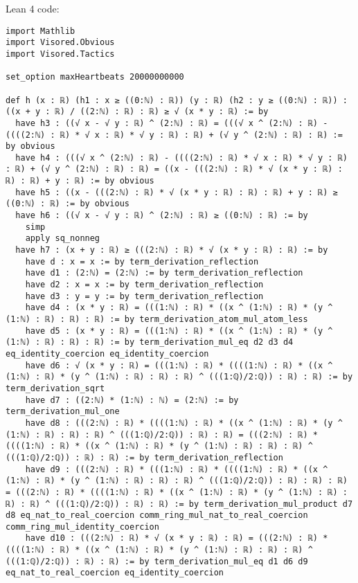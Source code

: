 \documentclass{article}
\begin{document}
Lean 4 code:
\begin{tcolorbox}[colback=white!10, width=\linewidth]
\begin{lstlisting}[language=Lean4]
import Mathlib
import Visored.Obvious
import Visored.Tactics

set_option maxHeartbeats 20000000000

def h (x : ℝ) (h1 : x ≥ ((0:ℕ) : ℝ)) (y : ℝ) (h2 : y ≥ ((0:ℕ) : ℝ)) : ((x + y : ℝ) / ((2:ℕ) : ℝ) : ℝ) ≥ √ (x * y : ℝ) := by
  have h3 : ((√ x - √ y : ℝ) ^ (2:ℕ) : ℝ) = (((√ x ^ (2:ℕ) : ℝ) - ((((2:ℕ) : ℝ) * √ x : ℝ) * √ y : ℝ) : ℝ) + (√ y ^ (2:ℕ) : ℝ) : ℝ) := by obvious
  have h4 : (((√ x ^ (2:ℕ) : ℝ) - ((((2:ℕ) : ℝ) * √ x : ℝ) * √ y : ℝ) : ℝ) + (√ y ^ (2:ℕ) : ℝ) : ℝ) = ((x - (((2:ℕ) : ℝ) * √ (x * y : ℝ) : ℝ) : ℝ) + y : ℝ) := by obvious
  have h5 : ((x - (((2:ℕ) : ℝ) * √ (x * y : ℝ) : ℝ) : ℝ) + y : ℝ) ≥ ((0:ℕ) : ℝ) := by obvious
  have h6 : ((√ x - √ y : ℝ) ^ (2:ℕ) : ℝ) ≥ ((0:ℕ) : ℝ) := by
    simp
    apply sq_nonneg
  have h7 : (x + y : ℝ) ≥ (((2:ℕ) : ℝ) * √ (x * y : ℝ) : ℝ) := by
    have d : x = x := by term_derivation_reflection
    have d1 : (2:ℕ) = (2:ℕ) := by term_derivation_reflection
    have d2 : x = x := by term_derivation_reflection
    have d3 : y = y := by term_derivation_reflection
    have d4 : (x * y : ℝ) = (((1:ℕ) : ℝ) * ((x ^ (1:ℕ) : ℝ) * (y ^ (1:ℕ) : ℝ) : ℝ) : ℝ) := by term_derivation_atom_mul_atom_less
    have d5 : (x * y : ℝ) = (((1:ℕ) : ℝ) * ((x ^ (1:ℕ) : ℝ) * (y ^ (1:ℕ) : ℝ) : ℝ) : ℝ) := by term_derivation_mul_eq d2 d3 d4 eq_identity_coercion eq_identity_coercion
    have d6 : √ (x * y : ℝ) = (((1:ℕ) : ℝ) * ((((1:ℕ) : ℝ) * ((x ^ (1:ℕ) : ℝ) * (y ^ (1:ℕ) : ℝ) : ℝ) : ℝ) ^ (((1:ℚ)/2:ℚ)) : ℝ) : ℝ) := by term_derivation_sqrt
    have d7 : ((2:ℕ) * (1:ℕ) : ℕ) = (2:ℕ) := by term_derivation_mul_one
    have d8 : (((2:ℕ) : ℝ) * ((((1:ℕ) : ℝ) * ((x ^ (1:ℕ) : ℝ) * (y ^ (1:ℕ) : ℝ) : ℝ) : ℝ) ^ (((1:ℚ)/2:ℚ)) : ℝ) : ℝ) = (((2:ℕ) : ℝ) * ((((1:ℕ) : ℝ) * ((x ^ (1:ℕ) : ℝ) * (y ^ (1:ℕ) : ℝ) : ℝ) : ℝ) ^ (((1:ℚ)/2:ℚ)) : ℝ) : ℝ) := by term_derivation_reflection
    have d9 : (((2:ℕ) : ℝ) * (((1:ℕ) : ℝ) * ((((1:ℕ) : ℝ) * ((x ^ (1:ℕ) : ℝ) * (y ^ (1:ℕ) : ℝ) : ℝ) : ℝ) ^ (((1:ℚ)/2:ℚ)) : ℝ) : ℝ) : ℝ) = (((2:ℕ) : ℝ) * ((((1:ℕ) : ℝ) * ((x ^ (1:ℕ) : ℝ) * (y ^ (1:ℕ) : ℝ) : ℝ) : ℝ) ^ (((1:ℚ)/2:ℚ)) : ℝ) : ℝ) := by term_derivation_mul_product d7 d8 eq_nat_to_real_coercion comm_ring_mul_nat_to_real_coercion comm_ring_mul_identity_coercion
    have d10 : (((2:ℕ) : ℝ) * √ (x * y : ℝ) : ℝ) = (((2:ℕ) : ℝ) * ((((1:ℕ) : ℝ) * ((x ^ (1:ℕ) : ℝ) * (y ^ (1:ℕ) : ℝ) : ℝ) : ℝ) ^ (((1:ℚ)/2:ℚ)) : ℝ) : ℝ) := by term_derivation_mul_eq d1 d6 d9 eq_nat_to_real_coercion eq_identity_coercion

\end{lstlisting}
\end{tcolorbox}
\end{document}
